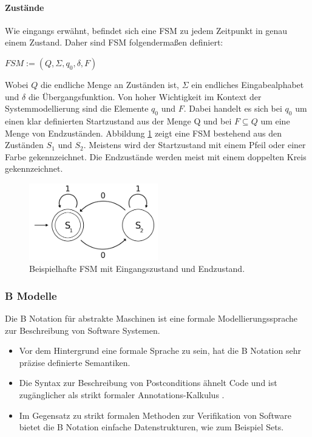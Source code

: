 \paragraph{Zustände}
Wie eingangs erwähnt, befindet sich eine \Gls{FSM} zu jedem Zeitpunkt in genau einem Zustand. Daher sind \Gls{FSM} folgendermaßen definiert: 

\begin{center}
$FSM := (Q, \Sigma, q_0, \delta, F)$
\end{center}

Wobei $Q$ die endliche Menge an Zuständen ist, $\Sigma$ ein endliches Eingabealphabet und $\delta$ die Übergangsfunktion. Von hoher Wichtigkeit im Kontext der Systemmodellierung sind die Elemente $q_0$ und $F$. Dabei handelt es sich bei $q_0$ um einen klar definierten Startzustand aus der Menge Q und bei $F \subseteq Q$ um eine Menge von Endzuständen. Abbildung \ref{fig:fsm_example} zeigt eine \Gls{FSM} bestehend aus den Zuständen $S_1$ und $S_2$. Meistens wird der Startzustand mit einem Pfeil oder einer Farbe gekennzeichnet. Die Endzustände werden meist mit einem doppelten Kreis gekennzeichnet.

\begin{figure}[h] 
  \centering
     \includegraphics[width=0.5\textwidth]{figures/FSM_example.png}
  \caption{Beispielhafte FSM mit Eingangszustand und Endzustand.}
  \label{fig:fsm_example}
\end{figure}

\subsubsection{B Modelle}
Die B Notation für abstrakte Maschinen ist eine formale Modellierungssprache zur Beschreibung von Software Systemen.
\begin{itemize}
\item Vor dem Hintergrund eine formale Sprache zu sein, hat die B Notation sehr präzise definierte Semantiken.
\item Die Syntax zur Beschreibung von Postconditions ähnelt Code und ist zugänglicher als strikt formaler Annotations-Kalkulus \cite{huth_logic_2004}.
\item Im Gegensatz zu strikt formalen Methoden zur Verifikation von Software bietet die B Notation einfache Datenstrukturen, wie zum Beispiel Sets.
\end{itemize}

